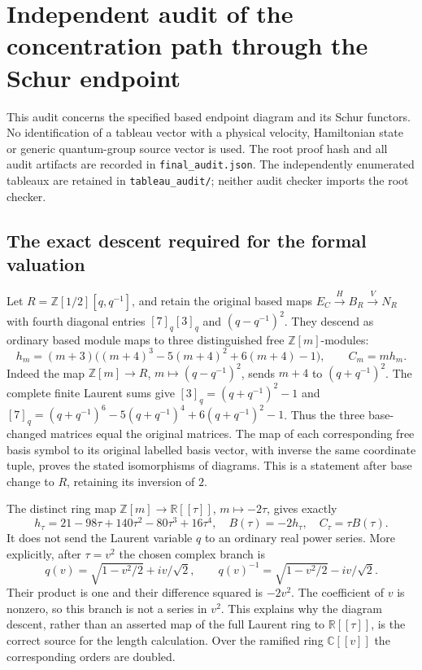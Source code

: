 \section*{Independent audit of the concentration path through the Schur endpoint}

This audit concerns the specified based endpoint diagram and its Schur
functors. No identification of a tableau vector with a physical velocity,
Hamiltonian state or generic quantum-group source vector is used.
The root proof hash and all audit artifacts are recorded in
\texttt{final\_audit.json}. The independently enumerated tableaux are
retained in \texttt{tableau\_audit/}; neither audit checker imports the
root checker.

\subsection*{The exact descent required for the formal valuation}

Let $R=\mathbb Z[1/2][q,q^{-1}]$, and retain the original based maps
$E_C\xrightarrow{H}B_R\xrightarrow{V}N_R$ with fourth diagonal
entries $[7]_q[3]_q$ and $(q-q^{-1})^2$. They descend as ordinary
based module maps to three distinguished free $\mathbb Z[m]$-modules:
\[
 h_m=(m+3)\bigl((m+4)^3-5(m+4)^2+6(m+4)-1\bigr),
 \qquad C_m=mh_m.
\]
Indeed the map $\mathbb Z[m]\to R$, $m\mapsto(q-q^{-1})^2$,
sends $m+4$ to $(q+q^{-1})^2$. The complete finite Laurent sums give
$[3]_q=(q+q^{-1})^2-1$ and
$[7]_q=(q+q^{-1})^6-5(q+q^{-1})^4+6(q+q^{-1})^2-1$.
Thus the three base-changed matrices equal the original matrices.
The map of each corresponding free basis symbol to its original
labelled basis vector, with inverse the same coordinate tuple,
proves the stated isomorphisms of diagrams. This is a statement
after base change to $R$, retaining its inversion of $2$.

The distinct ring map $\mathbb Z[m]\to\mathbb R[[\tau]]$,
$m\mapsto-2\tau$, gives exactly
\[
 h_\tau=21-98\tau+140\tau^2-80\tau^3+16\tau^4,
 \quad B(\tau)=-2h_\tau,
 \quad C_\tau=\tau B(\tau).
\]
It does not send the Laurent variable $q$ to an ordinary real power
series. More explicitly, after $\tau=v^2$ the chosen complex branch is
\[
 q(v)=\sqrt{1-v^2/2}+iv/\sqrt2,
 \qquad q(v)^{-1}=\sqrt{1-v^2/2}-iv/\sqrt2.
\]
Their product is one and their difference squared is $-2v^2$.
The coefficient of $v$ is nonzero, so this branch is not a series
in $v^2$. This explains why the diagram descent, rather than an
asserted map of the full Laurent ring to $\mathbb R[[\tau]]$, is
the correct source for the length calculation. Over the ramified
ring $\mathbb C[[v]]$ the corresponding orders are doubled.

